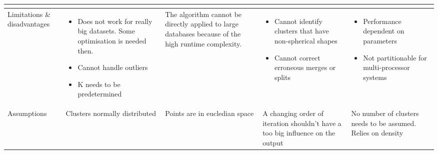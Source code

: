 \documentclass[11pt,a4paper,oneside]{article}
\begin{document}
{\begin{landscape}
\begin{table}[p!]
\begin{tabular}{p{2cm}||p{5.5cm}|p{5.5cm}|p{5.5cm}|p{5.5cm}}
\begin{itemize}[leftmargin=*]
\end{itemize}
\\
\hline


Limitations \& disadvantages&
\vspace{-\topsep}
\begin{itemize}[leftmargin=*]
\itemsep0em 
\item Does not work for really big datasets. Some optimisation is needed then. 
\item Cannot handle outliers 
\item K needs to be predetermined
\end{itemize}

&
The algorithm cannot be directly applied to large databases because of the high runtime complexity.
&
\vspace{-\topsep}
\begin{itemize}[leftmargin=*]
\itemsep0em 
\item Cannot identify clusters that have non-spherical shapes
\item Cannot correct erroneous merges or splits
\end{itemize}

&
\vspace{-\topsep}
\begin{itemize}[leftmargin=*]
\itemsep0em 
\item Performance dependent on parameters
\item Not partitionable for multi-processor systems
\end{itemize}
\\
\hline
Assumptions & Clusters normally distributed & Points are in eucledian space& 
A changing order of iteration shouldn't have a too big influence on the output& No number of clusters needs to be assumed. Relies on density\\

\end{tabular}
\end{table}

\end{landscape}

}

\clearpage
\nocite{*}
\printbibliography
\end{document}
